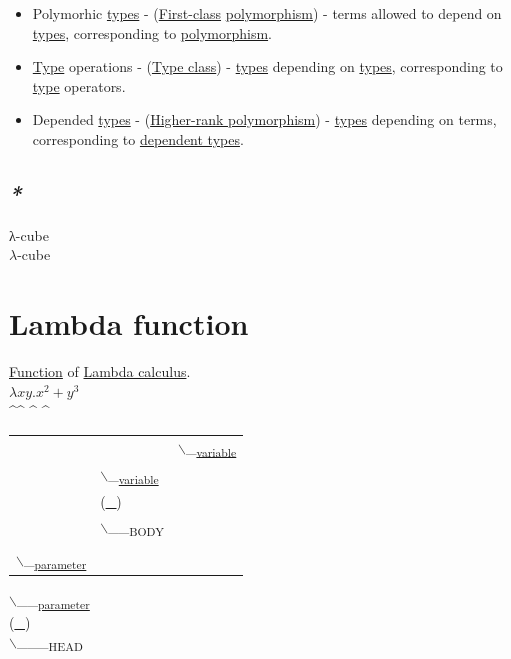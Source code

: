 \documentclass[a4paper,14pt,oneside]{book}
\begin{document}
\begin{itemize}
\item Polymorhic \hyperref[org6a89ae9]{types} - (\hyperref[orgf8f6e15]{First-class} \hyperref[org0e22895]{polymorphism}) - terms allowed to depend on \hyperref[org6a89ae9]{types}, corresponding to \hyperref[org0e22895]{polymorphism}.\\
\item \hyperref[org9582fb8]{Type} operations - (\hyperref[orgfc5e2bb]{Type class}) - \hyperref[org6a89ae9]{types} depending on \hyperref[org6a89ae9]{types}, corresponding to \hyperref[org9582fb8]{type} operators.\\
\item Depended \hyperref[org6a89ae9]{types} - (\hyperref[orgab2bdd7]{Higher-rank polymorphism}) - \hyperref[org6a89ae9]{types} depending on terms, corresponding to \hyperref[org6a1a967]{dependent types}.\\
\end{itemize}

\subsection{\emph{*}}
\label{sec:org13a87f1}

\label{org73543d8}λ-cube\\
\label{org0157ba6}\(\lambda\)-cube\\

\section{\label{orgab14ef0}Lambda function}
\label{sec:org8142ecc}
\hyperref[org5668b39]{Function} of \hyperref[orgba427a3]{Lambda calculus}.\\
\(\lambda x y.x^2 + y^3\)\\
 \^{}\^{} \^{}    \^{}\\
\begin{center}
\begin{tabular}{lll}
 &  & $\backslash$_\textsubscript{\hyperref[orgb033b1c]{variable}}\\
 & $\backslash$_\textsubscript{\hyperref[orgb033b1c]{variable}}\\
 & (\uline{\uline{\_}})\\
 & $\backslash$_\_\textsubscript{BODY}\\
\\
$\backslash$_\textsubscript{\hyperref[org286c581]{parameter}}\\
\end{tabular}
\end{center}
  $\backslash$_\_\textsubscript{\hyperref[org286c581]{parameter}}\\
(\uline{\_})\\
   $\backslash$_\_\_\textsubscript{HEAD}\\
\end{document}
